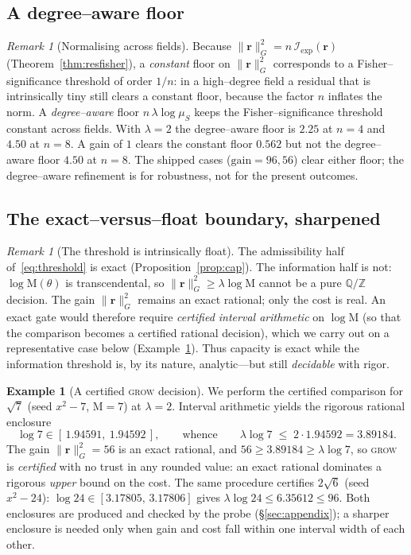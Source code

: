 \documentclass[11pt]{article}
\theoremstyle{plain}
\theoremstyle{definition}
\newtheorem{example}[theorem]{Example}
\theoremstyle{remark}
\newtheorem{remark}[theorem]{Remark}
\newcommand{\Q}{\mathbb{Q}}
\newcommand{\Z}{\mathbb{Z}}
\newcommand{\Mah}{\mathrm{M}}
\newcommand{\Fish}{\mathcal{I}}
\newcommand{\rr}{\mathbf{r}}
\newcommand{\GG}{G}
\begin{document}
\subsection{A degree--aware floor}
\begin{remark}[Normalising across fields]\label{rem:degreeaware}
Because $\lVert\rr\rVert_{\GG}^2=n\,\Fish_{\mathrm{exp}}(\rr)$ (Theorem~\ref{thm:resfisher}), a \emph{constant}
floor on $\lVert\rr\rVert_{\GG}^2$ corresponds to a Fisher--significance threshold of order $1/n$: in a
high--degree field a residual that is intrinsically tiny still clears a constant floor, because the factor
$n$ inflates the norm. A \emph{degree--aware} floor $n\,\lambda\log\mu_S$ keeps the Fisher--significance
threshold constant across fields. With $\lambda=2$ the degree--aware floor is $2.25$ at $n=4$ and $4.50$ at
$n=8$. A gain of $1$ clears the constant floor $0.562$ but not the degree--aware floor $4.50$ at $n=8$. The
shipped cases ($\mathrm{gain}=96,56$) clear either floor; the degree--aware refinement is for robustness, not
for the present outcomes.
\end{remark}

\subsection{The exact--versus--float boundary, sharpened}
\begin{remark}[The threshold is intrinsically float]\label{rem:thresholdfloat}
The admissibility half of~\eqref{eq:threshold} is exact (Proposition~\ref{prop:cap}). The information half is
not: $\log\Mah(\theta)$ is transcendental, so $\lVert\rr\rVert_{\GG}^2\ge\lambda\log\Mah$ cannot be a pure
$\Q/\Z$ decision. The gain $\lVert\rr\rVert_{\GG}^2$ remains an exact rational; only the cost is real. An
exact gate would therefore require \emph{certified interval arithmetic} on $\log\Mah$ (so that the comparison
becomes a certified rational decision), which we carry out on a representative case below
(Example~\ref{ex:certified}). Thus capacity is exact while the information threshold is, by its nature,
analytic---but still \emph{decidable} with rigor.
\end{remark}

\begin{example}[A certified \textsc{grow} decision]\label{ex:certified}
We perform the certified comparison for $\sqrt7$ (seed $x^2-7$, $\Mah=7$) at $\lambda=2$. Interval arithmetic
yields the rigorous rational enclosure
\[
  \log 7\in[\,1.94591,\ 1.94592\,],\qquad\text{whence}\qquad \lambda\log 7\;\le\; 2\cdot 1.94592=3.89184 .
\]
The gain $\lVert\rr\rVert_{\GG}^2=56$ is an exact rational, and $56\ge 3.89184\ge\lambda\log 7$, so
\textsc{grow} is \emph{certified} with no trust in any rounded value: an exact rational dominates a rigorous
\emph{upper} bound on the cost. The same procedure certifies $2\sqrt6$ (seed $x^2-24$):
$\log 24\in[3.17805,\,3.17806]$ gives $\lambda\log 24\le 6.35612\le 96$. Both enclosures are produced and
checked by the probe (\S\ref{sec:appendix}); a sharper enclosure is needed only when gain and cost fall within
one interval width of each other.
\end{example}
\end{document}

